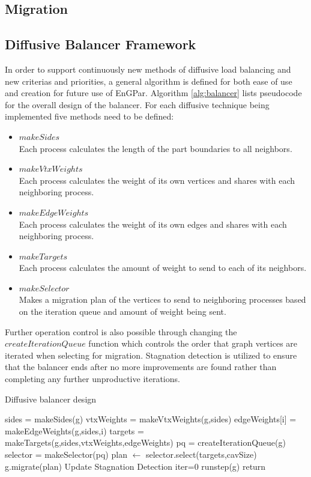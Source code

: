 \documentclass[a4paper]{article}
\begin{document}
\subsection{Migration}


\subsection{Diffusive Balancer Framework}
In order to support continuously new methods of diffusive load balancing and new criterias and priorities, a general algorithm is defined for both ease of use and creation for future use of EnGPar. Algorithm \ref{alg:balancer} lists pseudocode for the overall design of the balancer. For each diffusive technique being implemented five methods need to be defined:
\begin{itemize}
  \item $makeSides$\\
    Each process calculates the length of the part boundaries to all neighbors.
  \item $makeVtxWeights$ \\
    Each process calculates the weight of its own vertices and shares with each neighboring process.
  \item $makeEdgeWeights$ \\
    Each process calculates the weight of its own edges and shares with each neighboring process.
  \item $makeTargets$\\
    Each process calculates the amount of weight to send to each of its neighbors.
  \item $makeSelector$\\
    Makes a migration plan of the vertices to send to neighboring processes based on the iteration queue and amount of weight being sent.
\end{itemize}
Further operation control is also possible through changing the $createIterationQueue$ function which controls the order that graph vertices are iterated when selecting for migration. Stagnation detection is utilized to ensure that the balancer ends after no more improvements are found rather than completing any further unproductive iterations.

\begin{algorithm}
\caption{Diffusive balancer design}\label{alg:balancer}
\begin{algorithmic}
  \State sides = makeSides(g)
  \State vtxWeights = makeVtxWeights(g,sides)
  \State edgeWeights[i] = makeEdgeWeights(g,sides,i)
  \EndFor
  \State targets = makeTargets(g,sides,vtxWeights,edgeWeights)
  \State pq = createIterationQueue(g)
  \State selector = makeSelector(pq)
  \State plan $\leftarrow$ selector.select(targets,cavSize)
  \EndFor
  \State g.migrate(plan)
  \State Update Stagnation Detection
  \EndProcedure
  \State iter=0
  \State runstep(g)
  \State return
  \EndIf
  \EndFor
  \EndProcedure
\end{algorithmic}
\end{algorithm}
\end{document}
